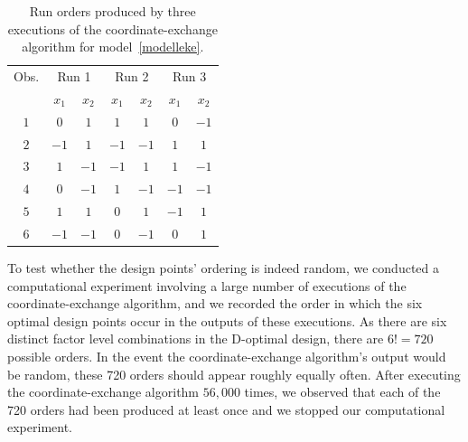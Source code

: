 \begin{table}
\caption{Run orders produced by three executions of the coordinate-exchange algorithm for model~\eqref{modelleke}.}
\begin{center}
\label{ordersof3starts}
\begin{tabular}{|c|cc|cc|cc|}
\hline 
Obs. & \multicolumn{2}{|c|}{Run 1} & \multicolumn{2}{|c|}{Run 2} & \multicolumn{2}{|c|}{Run 3}\\
& $x_1$ & $x_2$ & $x_1$ & $x_2$& $x_1$ & $x_2$\\
\hline
$1	$&$	0	$&$	1	$&$	1	$&$	1	$&$	0	$&$	-1	 $\\
$2	$&$	-1	$&$	1	$&$	-1	$&$	-1	$&$	1	$&$	1	 $\\
$3	$&$	1	$&$	-1	$&$	-1	$&$	1	$&$	1	$&$	-1	 $\\
$4	$&$	0	$&$	-1	$&$	1	$&$	-1	$&$	-1	$&$	-1	 $\\
$5	$&$	1	$&$	1	$&$	0	$&$	1	$&$	-1	$&$	1	 $\\
$6	$&$	-1	$&$	-1	$&$	0	$&$	-1	$&$	0	$&$	1	 $\\
\hline
\end{tabular}
\end{center}
\end{table}

To test whether the design points' ordering is indeed random, we conducted a computational experiment involving a large number of executions of the coordinate-exchange algorithm, and we recorded the order in which the six optimal design points occur in the outputs of these executions. As there are six distinct factor level combinations in the D-optimal design, there are $6!=720$ possible orders. In the event the coordinate-exchange algorithm's output would be random, these 720 orders should appear roughly equally often. After executing the coordinate-exchange algorithm $56,000$ times, we observed that each of the 720 orders had been produced at least once and we stopped our computational experiment.\\


